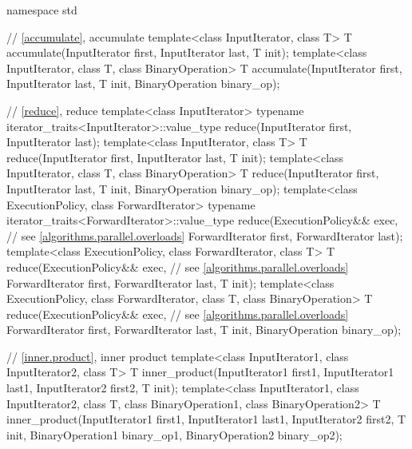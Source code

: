 %
\begin{codeblock}
namespace std {
  // \ref{accumulate}, accumulate
  template<class InputIterator, class T>
    T accumulate(InputIterator first, InputIterator last, T init);
  template<class InputIterator, class T, class BinaryOperation>
    T accumulate(InputIterator first, InputIterator last, T init, BinaryOperation binary_op);

  // \ref{reduce}, reduce
  template<class InputIterator>
    typename iterator_traits<InputIterator>::value_type
      reduce(InputIterator first, InputIterator last);
  template<class InputIterator, class T>
    T reduce(InputIterator first, InputIterator last, T init);
  template<class InputIterator, class T, class BinaryOperation>
    T reduce(InputIterator first, InputIterator last, T init, BinaryOperation binary_op);
  template<class ExecutionPolicy, class ForwardIterator>
    typename iterator_traits<ForwardIterator>::value_type
      reduce(ExecutionPolicy&& exec,                            // see \ref{algorithms.parallel.overloads}
             ForwardIterator first, ForwardIterator last);
  template<class ExecutionPolicy, class ForwardIterator, class T>
    T reduce(ExecutionPolicy&& exec,                            // see \ref{algorithms.parallel.overloads}
             ForwardIterator first, ForwardIterator last, T init);
  template<class ExecutionPolicy, class ForwardIterator, class T, class BinaryOperation>
    T reduce(ExecutionPolicy&& exec,                            // see \ref{algorithms.parallel.overloads}
             ForwardIterator first, ForwardIterator last, T init, BinaryOperation binary_op);

  // \ref{inner.product}, inner product
  template<class InputIterator1, class InputIterator2, class T>
    T inner_product(InputIterator1 first1, InputIterator1 last1,
                    InputIterator2 first2, T init);
  template<class InputIterator1, class InputIterator2, class T,
           class BinaryOperation1, class BinaryOperation2>
    T inner_product(InputIterator1 first1, InputIterator1 last1,
                    InputIterator2 first2, T init,
                    BinaryOperation1 binary_op1, BinaryOperation2 binary_op2);

}
\end{codeblock}
